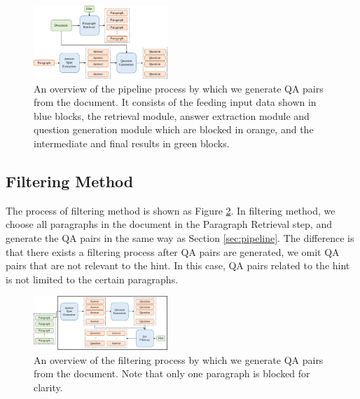 

\begin{figure}[th]
	\begin{center}
	\includegraphics[width=0.45\textwidth]{pic/pipeline.pdf}
		\caption{\label{fig:pipeline} An overview of the pipeline process by which we generate QA pairs from the document. It consists of the feeding input data shown in blue blocks, the retrieval module, answer extraction module and question generation module which are blocked in orange, and the intermediate and final results in green blocks.}
	\end{center}
\end{figure}

\subsection{Filtering Method}
The process of filtering method is shown as Figure \ref{fig:filtering}. In filtering method, we choose all paragraphs in the document in the Paragraph Retrieval step, and generate the QA pairs in the same way as Section \ref{sec:pipeline}. The difference is that there exists a filtering process after QA pairs are generated, we omit QA pairs that are not relevant to the hint. In this case, QA pairs related to the hint is not limited to the certain paragraphs.

\begin{figure}[th]
	\begin{center}
	\includegraphics[width=0.45\textwidth]{pic/filtering.pdf}
		\caption{\label{fig:filtering} An overview of the filtering process by which we generate QA pairs from the document. Note that only one paragraph is blocked for clarity.}
	\end{center}
\end{figure}

